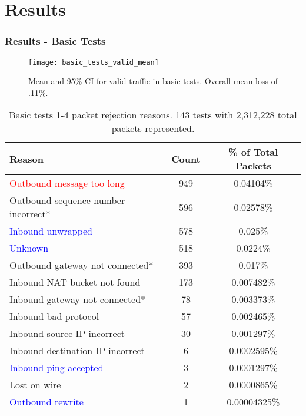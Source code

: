 \documentclass{beamer}
\begin{document}
\section{Results}
\begin{frame}
	\frametitle{Results - Basic Tests}

	\begin{overprint}
		\begin{figure}
		\caption{Mean and 95\% CI for valid traffic in basic tests. Overall mean loss of .11\%.}
		\vspace{-20pt}
		\texttt{[image: basic\_tests\_valid\_mean]}
		\end{figure}

		\footnotesize{
		\begin{table}
		\caption{Basic tests 1-4 packet rejection reasons. 143 tests with 2,312,228 total packets represented.}
		\label{tbl:basic_loss_reasons_valid}
		\centering
		\begin{tabular}{lcc}
		\toprule
		\textbf{Reason} & \textbf{Count}  & \textbf{\% of Total Packets}\\
		\hline
		\textcolor{red}{Outbound message too long} & 949 & 0.04104\%\\
		Outbound sequence number incorrect* & 596 & 0.02578\%\\
		\textcolor{blue}{Inbound unwrapped} & 578 & 0.025\%\\
		\textcolor{blue}{Unknown} & 518 & 0.0224\%\\
		Outbound gateway not connected* & 393 & 0.017\%\\
		Inbound NAT bucket not found & 173 & 0.007482\%\\
		Inbound gateway not connected* & 78 & 0.003373\%\\
		Inbound bad protocol & 57 & 0.002465\%\\
		Inbound source IP incorrect & 30 & 0.001297\%\\
		Inbound destination IP incorrect & 6 & 0.0002595\%\\
		\textcolor{blue}{Inbound ping accepted} & 3 & 0.0001297\%\\
		Lost on wire & 2 & 0.0000865\%\\
		\textcolor{blue}{Outbound rewrite} & 1 & 0.00004325\%\\
		\bottomrule
		\end{tabular}
		\end{table}
		}


\end{overprint}
\end{frame}
\end{document}
